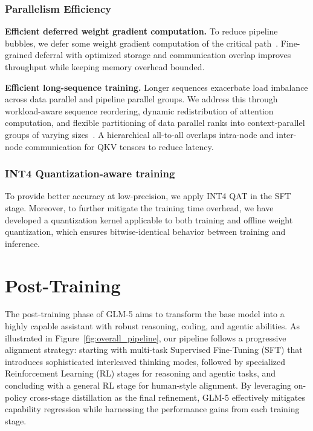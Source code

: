 \documentclass{article}
\theoremstyle{definition}
\begin{document}
\subsubsection{Parallelism Efficiency}

\textbf{Efficient deferred weight gradient computation.} To reduce pipeline bubbles, we defer some weight gradient computation of the critical path~\cite{qi2023zero}. Fine-grained deferral with optimized storage and communication overlap improves throughput while keeping memory overhead bounded.

\textbf{Efficient long-sequence training.} Longer sequences exacerbate load imbalance across data parallel and pipeline parallel groups. We address this through workload-aware sequence reordering, dynamic redistribution of attention computation, and flexible partitioning of data parallel ranks into context-parallel groups of varying sizes~\cite{ge2025bytescale,wang2025flexsp}. A hierarchical all-to-all overlaps intra-node and inter-node communication for QKV tensors to reduce latency.

\subsubsection{INT4 Quantization-aware training}

To provide better accuracy at low-precision, we apply INT4 QAT in the SFT stage. Moreover, to further mitigate the training time overhead, we have developed a quantization kernel applicable to both training and offline weight quantization, which ensures bitwise-identical behavior between training and inference.

\section{Post-Training}

The post-training phase of GLM-5 aims to transform the base model into a highly capable assistant with robust reasoning, coding, and agentic abilities. As illustrated in Figure~\ref{fig:overall_pipeline}, our pipeline follows a progressive alignment strategy: starting with multi-task Supervised Fine-Tuning (SFT) that introduces sophisticated interleaved thinking modes, followed by specialized Reinforcement Learning (RL) stages for reasoning and agentic tasks, and concluding with a general RL stage for human-style alignment. By leveraging on-policy cross-stage distillation as the final refinement, GLM-5 effectively mitigates capability regression while harnessing the performance gains from each training stage.
\end{document}
